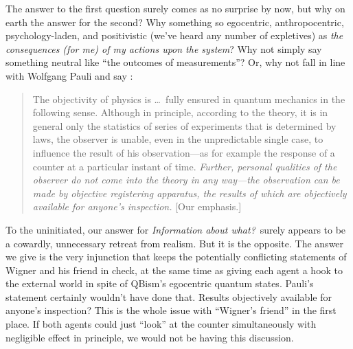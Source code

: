 \documentclass[aps,pra,superscriptaddress,12pt,tightenlines,nofootinbib]{revtex4-2}
\begin{document}
The answer to the first question surely comes as no surprise by now, but why on earth the answer for the second?   Why something so egocentric, anthro\-po\-centric, psychology-laden, and positivistic (we've heard any number of expletives) as {\it the consequences (for me) of my actions upon the system}?  Why not simply say something neutral like ``the outcomes of measurements''?  Or, why not fall in line with Wolfgang Pauli and say \cite{Pauli94}:
\begin{quote}
The objectivity of physics is \ldots\ fully ensured in quantum mechanics in the following sense.  Although in principle, according to the theory, it is in general only the statistics of series of experiments that is determined by laws, the observer is unable, even in the unpredictable single case, to influence the result of his observation---as for example the response of a counter at a particular instant of time.  {\it Further, personal qualities of the observer do not come into the theory in any way---the observation can be made by objective registering apparatus, the results of which are objectively available for anyone's inspection.}  [Our emphasis.]
\end{quote}
To the uninitiated, our answer for {\it Information about what?}\ surely appears to be a cowardly, unnecessary retreat from realism.  But it is the opposite.  The answer we give is the very injunction that keeps the potentially conflicting statements of Wigner and his friend in check,  at the same time as giving each agent a hook to the external world in spite of QBism's egocentric quantum states.  Pauli's statement certainly wouldn't have done that.  Results objectively available for anyone's inspection?  This is the whole issue with ``Wigner's friend'' in the first place.  If both agents could just ``look'' at the counter simultaneously with negligible effect in principle, we would not be having this discussion.
\end{document}

